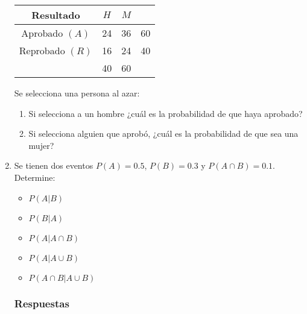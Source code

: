 \documentclass[dvipsnames,a4paper]{book}
\begin{document}
\begin{enumerate}[{Ej1. }]
\begin{center}
    \begin{tabular}{ |c|c|c|c| }
        \hline
        Resultado& \(H\) & \(M\) &\\ \hline
        Aprobado \(\left(A\right) \) &24&36&60\\ \hline
        Reprobado \(\left(R\right)\) &16&24&40\\ \hline
                        &40&60&\\ \hline
    \end{tabular}
\end{center}
Se selecciona una persona al azar:
\begin{enumerate}
    \item Si selecciona a un hombre ¿cuál es la probabilidad de que haya
        aprobado?
    \item Si selecciona alguien que aprobó, ¿cuál es la probabilidad de que sea
        una mujer?
\end{enumerate}


\item Se tienen dos eventos \(P\left(A\right)=0.5\), \(P\left(B\right)=0.3\) y \(P\left(A\cap B\right)=0.1\). Determine:
    \begin{itemize}
        \item \(P\left(A|B\right)\)
        \item \(P\left(B|A\right)\)
         \item \(P\left(A|A\cap B\right)\)
         \item \(P\left(A|A\cup B\right)\)
         \item \(P\left(A\cap B|A\cup B\right)\)
    \end{itemize}

    \subsubsection{Respuestas}


\end{enumerate}
\end{document}
